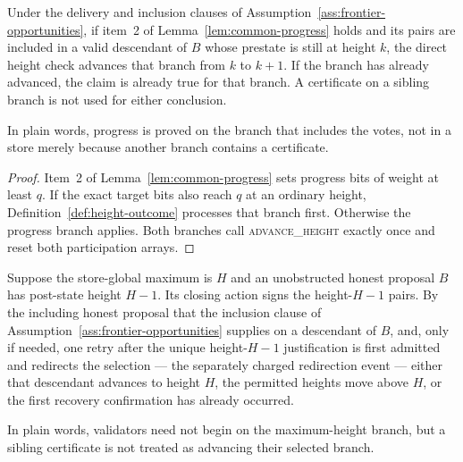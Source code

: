 \begin{lemma}
\label{lem:common-action-advances}
Under the delivery and inclusion clauses of
Assumption~\ref{ass:frontier-opportunities}, if item~2 of
Lemma~\ref{lem:common-progress} holds and its pairs are included in a valid descendant of \(B\)
whose prestate is still at height \(k\), the direct height check advances
that branch from \(k\) to \(k+1\).  If the branch has already advanced, the
claim is already true for that branch.  A certificate on a sibling branch is
not used for either conclusion.

In plain words, progress is proved on the branch that includes the votes, not
in a store merely because another branch contains a certificate.
\end{lemma}

\begin{proof}
Item~2 of Lemma~\ref{lem:common-progress} sets progress bits of weight at least \(q\).
If the exact target bits also reach \(q\) at an ordinary height,
Definition~\ref{def:height-outcome} processes that branch first.  Otherwise
the progress branch applies.  Both branches call
\textsc{advance\_height} exactly once and reset both participation arrays.
\end{proof}

\begin{lemma}
\label{lem:height-catchup}
Suppose the store-global maximum is \(H\) and an unobstructed honest proposal
\(B\) has post-state height \(H-1\).  Its closing action signs the
height-\(H-1\) pairs.  By the including honest proposal that the
inclusion clause of Assumption~\ref{ass:frontier-opportunities}
supplies on a descendant of \(B\), and, only if needed, one retry after the
unique height-\(H-1\) justification is first admitted and redirects the
selection --- the separately charged redirection event --- either that
descendant advances to
height \(H\), the permitted heights move above \(H\), or the first recovery
confirmation has already occurred.

In plain words, validators need not begin on the maximum-height branch, but
a sibling certificate is not treated as advancing their selected branch.
\end{lemma}

